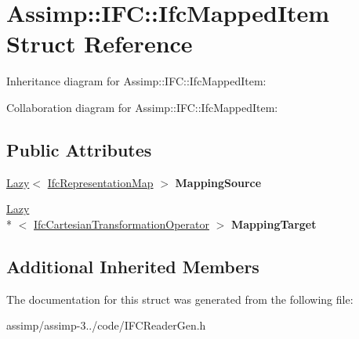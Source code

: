 \hypertarget{struct_assimp_1_1_i_f_c_1_1_ifc_mapped_item}{\section{Assimp\+:\+:I\+F\+C\+:\+:Ifc\+Mapped\+Item Struct Reference}
\label{struct_assimp_1_1_i_f_c_1_1_ifc_mapped_item}
}


Inheritance diagram for Assimp\+:\+:I\+F\+C\+:\+:Ifc\+Mapped\+Item\+:


Collaboration diagram for Assimp\+:\+:I\+F\+C\+:\+:Ifc\+Mapped\+Item\+:
\subsection*{Public Attributes}
\begin{DoxyCompactItemize}
\item 
\hypertarget{struct_assimp_1_1_i_f_c_1_1_ifc_mapped_item_a7383d03a4e32b4540b95c117f73a17df}{\hyperlink{struct_assimp_1_1_s_t_e_p_1_1_lazy}{Lazy}$<$ \hyperlink{struct_assimp_1_1_i_f_c_1_1_ifc_representation_map}{Ifc\+Representation\+Map} $>$ {\bfseries Mapping\+Source}}\label{struct_assimp_1_1_i_f_c_1_1_ifc_mapped_item_a7383d03a4e32b4540b95c117f73a17df}

\item 
\hypertarget{struct_assimp_1_1_i_f_c_1_1_ifc_mapped_item_acb518bb37ef54880d5a8f2dfb56e3c82}{\hyperlink{struct_assimp_1_1_s_t_e_p_1_1_lazy}{Lazy}\\*
$<$ \hyperlink{struct_assimp_1_1_i_f_c_1_1_ifc_cartesian_transformation_operator}{Ifc\+Cartesian\+Transformation\+Operator} $>$ {\bfseries Mapping\+Target}}\label{struct_assimp_1_1_i_f_c_1_1_ifc_mapped_item_acb518bb37ef54880d5a8f2dfb56e3c82}

\end{DoxyCompactItemize}
\subsection*{Additional Inherited Members}


The documentation for this struct was generated from the following file\+:\begin{DoxyCompactItemize}
\item 
assimp/assimp-\/3../code/I\+F\+C\+Reader\+Gen.\+h\end{DoxyCompactItemize}
